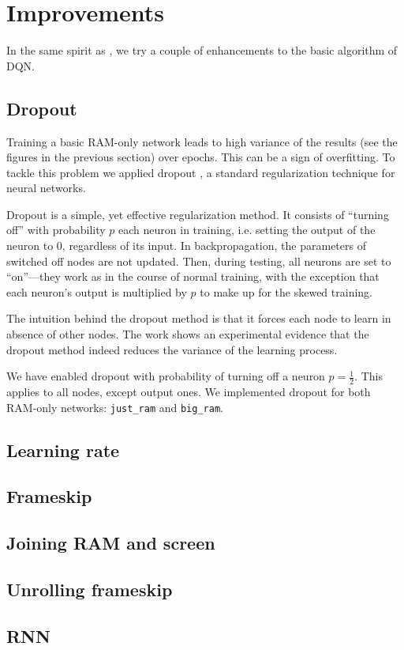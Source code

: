 \section{Improvements}
In the same spirit as \cite{nips-dqn}, we try a couple of enhancements to the basic algorithm of DQN.

\subsection{Dropout}
Training a basic RAM-only network leads to high variance of the results (see the figures in the previous section) over epochs. This can be a sign of overfitting. To tackle this problem we applied dropout \cite{dropout}, a standard regularization technique for neural networks.

Dropout is a simple, yet effective regularization method. It consists of ``turning off'' with probability $p$ each neuron in training, i.e. setting the output of the neuron to $0$, regardless of its input. In backpropagation, the parameters of switched off nodes are not updated. Then, during testing, all neurons are set to ``on''---they work as in the course of normal training, with the exception that each neuron's output is multiplied by $p$ to make up for the skewed training.

The intuition behind the dropout method is that it forces each node to learn in absence of other nodes. The work \cite{dropout-variance} shows an experimental evidence that the dropout method indeed reduces the variance of the learning process.

We have enabled dropout with probability of turning off a neuron $p = \frac{1}{2}$. This applies to all nodes, except output ones. We implemented dropout for both RAM-only networks: \texttt{just\_ram} and \texttt{big\_ram}.

\subsection{Learning rate}

\subsection{Frameskip}\label{our-frameskip}
\subsection{Joining RAM and screen}\label{screen-ram-networks}
\subsection{Unrolling frameskip}
\subsection{RNN}

